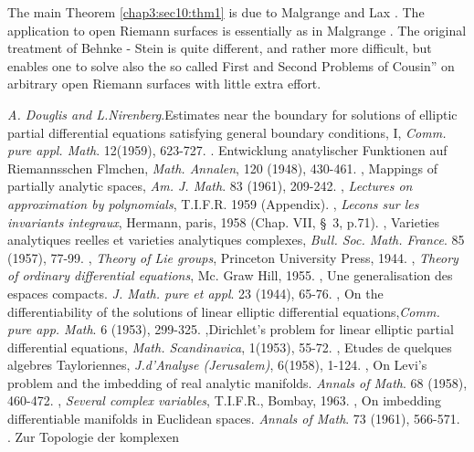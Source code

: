 The main Theorem \ref{chap3:sec10:thm1} is due to Malgrange \cite{27}
and Lax \cite{25}. The
application to open Riemann surfaces is essentially as in Malgrange
\cite{27}. The original treatment of Behnke - Stein \cite{2} is quite different,
and rather more difficult, but enables one to solve also the so called
First and Second Problems of Cousin'' on arbitrary open Riemann
surfaces with little extra effort. 


\begin{thebibliography}{99}
 \textit{A. Douglis and L.Nirenberg}.\pageoriginale Estimates
  near the boundary for solutions of elliptic partial differential
  equations satisfying general boundary conditions, I,
  \textit{Comm. pure appl. Math}. 12(1959), 623-727. 
. Entwicklung anatylischer Funktionen auf
  Riemannsschen Flmchen, \textit{ Math. Annalen}, 120 (1948),
  430-461. 
, Mappings of partially analytic spaces,
  \textit{Am. J. Math}. 83 (1961), 209-242. 
, \textit{Lectures on approximation by
  polynomials}, T.I.F.R. 1959 (Appendix). 
, \textit{Lecons sur les invariants integraux},
  Hermann, paris, 1958 (Chap. VII, \S\ 3, p.71). 
, Varieties analytiques reelles et varieties
  analytiques complexes, \textit{ Bull. Soc. Math. France}. 85 (1957),
  77-99. 
, \textit{Theory of Lie groups}, Princeton
  University Press, 1944. 
, \textit{Theory of
  ordinary differential  equations}, Mc. Graw Hill, 1955. 
, Une generalisation des espaces
  compacts. \textit{J. Math. pure et appl}. 23 (1944), 65-76. 
, On the differentiability of the
  solutions of linear elliptic differential
  equations,\textit{Comm. pure app. Math}. 6 (1953), 299-325. 
,\pageoriginale Dirichlet's problem for linear elliptic
  partial differential equations, \textit{Math. Scandinavica},
  1(1953), 55-72. 
, Etudes de quelques algebres Tayloriennes,
  \textit{ J.d'Analyse (Jerusalem)}, 6(1958), 1-124. 
, On Levi's problem and the imbedding of
  real analytic manifolds. \textit{Annals of Math}. 68 (1958),
  460-472. 
, \textit{ Several complex variables},
  T.I.F.R., Bombay, 1963. 
, On imbedding  differentiable manifolds in
  Euclidean spaces. \textit{Annals of Math}. 73 (1961), 566-571. 
. Zur Topologie der komplexen

\end{thebibliography}
